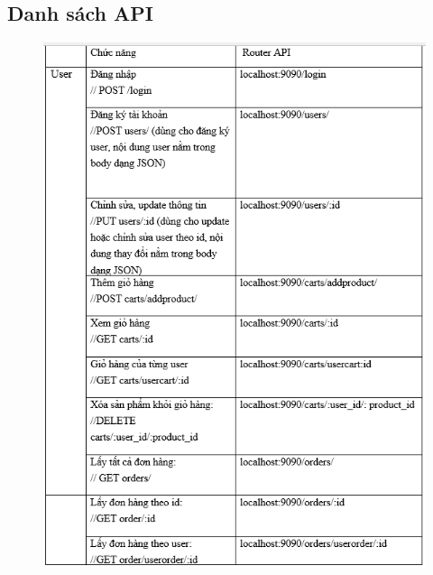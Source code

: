 \documentclass{article}
\begin{document}
{{{{{{{{{{{{{{{{{\subsection{Danh sách API }
{\large 
	\begin{center}
		\begin{figure}[htp]
			\begin{center}
				\includegraphics[scale=.900]{anh28.png}
			\end{center}
			

\end{figure}
\end{center}}}}}}}}}}}}}}}}}}}
\end{document}

